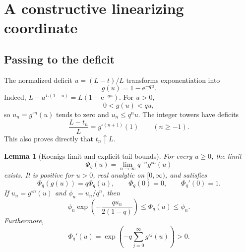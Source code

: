 \documentclass[11pt,letterpaper]{article}
\newtheorem{lemma}[theorem]{Lemma}
\theoremstyle{definition}\newtheorem{definition}[theorem]{Definition}
\theoremstyle{remark}\newtheorem{remark}[theorem]{Remark}
\newcommand{\ee}{\mathrm e}
\newcommand{\PhiQ}{\Phi_q}
\numberwithin{equation}{section}
\begin{document}
\section{A constructive linearizing coordinate}\label{sec:koenigs}

\subsection{Passing to the deficit}
The normalized deficit $u=(L-t)/L$ transforms exponentiation into
\begin{equation}\label{eq:g}
 g(u)=1-\ee^{-qu}.
\end{equation}
Indeed, $L-a^{L(1-u)}=L(1-\ee^{-qu})$. For $u>0$,
\begin{equation}\label{eq:contract}
 0<g(u)<qu,
\end{equation}
so $u_n=g^{\circ n}(u)$ tends to zero and $u_n\leq q^n u$. The integer towers have deficits
\begin{equation}\label{eq:towerdeficit}
 \frac{L-t_n}{L}=g^{\circ(n+1)}(1)\qquad(n\geq-1).
\end{equation}
This also proves directly that $t_n\uparrow L$.

\begin{lemma}[Koenigs limit and explicit tail bounds]\label{lem:phi}
For every $u\geq0$, the limit
\begin{equation}\label{eq:philimit}
 \PhiQ(u)=\lim_{n\to\infty}q^{-n}g^{\circ n}(u)
\end{equation}
exists. It is positive for $u>0$, real analytic on $[0,\infty)$, and satisfies
\begin{equation}\label{eq:phife}
 \PhiQ(g(u))=q\PhiQ(u),\qquad \PhiQ(0)=0,\qquad \PhiQ'(0)=1.
\end{equation}
If $u_n=g^{\circ n}(u)$ and $\phi_n=u_n/q^n$, then
\begin{equation}\label{eq:phibounds}
 \phi_n\exp\left(-\frac{q u_n}{2(1-q)}\right)
 \leq\PhiQ(u)\leq\phi_n.
\end{equation}
Furthermore,
\begin{equation}\label{eq:phiprime}
 \PhiQ'(u)=\exp\left(-q\sum_{j=0}^{\infty}g^{\circ j}(u)\right)>0.
\end{equation}
\end{lemma}
\end{document}
